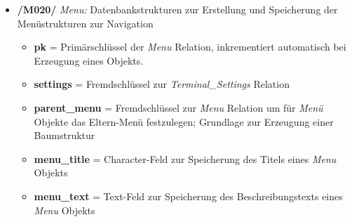 \newpage
\begin{itemize}
    \item \textbf{/M020/} \textit{Menu:} Datenbankstrukturen zur Erstellung und Speicherung der Menüstrukturen zur Navigation
    \begin{itemize}
        \item \textbf{pk} = Primärschlüssel der \textit{Menu} Relation, inkrementiert automatisch bei Erzeugung eines Objekts.
        \item \textbf{settings} = Fremdschlüssel zur \textit{Terminal\_Settings} Relation
        \item \textbf{parent\_menu} = Fremdschlüssel zur \textit{Menu} Relation um für \textit{Menü} Objekte das Eltern-Menü festzulegen; Grundlage zur Erzeugung einer Baumstruktur
        \item \textbf{menu\_title} = Character-Feld zur Speicherung des Titels eines \textit{Menu} Objekts
        \item \textbf{menu\_text} = Text-Feld zur Speicherung des Beschreibungstexts eines \textit{Menu} Objekts
    \end{itemize}
\end{itemize}
\vspace{0,5cm}
